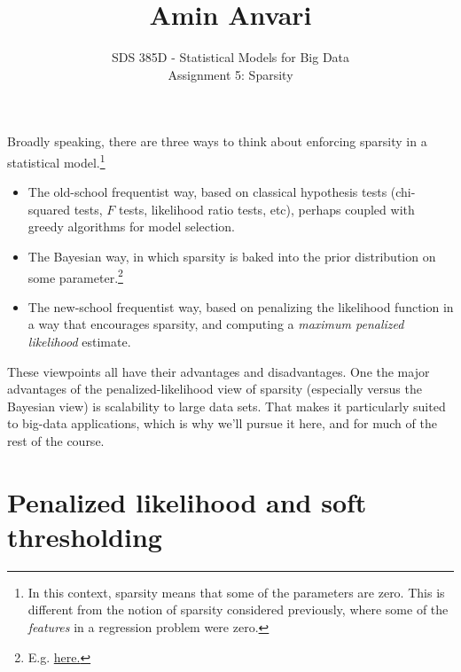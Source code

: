 \documentclass{article}
\title{Amin Anvari}
\date{}
\author{SDS 385D - Statistical Models for Big Data\\ Assignment 5: Sparsity}
\date{}  %
\begin{document}
\maketitle%

\bigskip


Broadly speaking, there are three ways to think about enforcing sparsity in a statistical model.\footnote{In this context, sparsity means that some of the parameters are zero.  This is different from the notion of sparsity considered previously, where some of the \textit{features} in a regression problem were zero.}
\begin{itemize}
\item The old-school frequentist way, based on classical hypothesis tests (chi-squared tests, $F$ tests, likelihood ratio tests, etc), perhaps coupled with greedy algorithms for model selection.
\item The Bayesian way, in which sparsity is baked into the prior distribution on some parameter.\footnote{E.g. \href{http://www-stat.wharton.upenn.edu/~edgeorge/Research_papers/fastN96.pdf}{here.}}
\item The new-school frequentist way, based on penalizing the likelihood function in a way that encourages sparsity, and computing a \textit{maximum penalized likelihood} estimate.
\end{itemize}

These viewpoints all have their advantages and disadvantages.  One the major advantages of the penalized-likelihood view of sparsity (especially versus the Bayesian view) is scalability to large data sets.  That makes it particularly suited to big-data applications, which is why we'll pursue it here, and for much of the rest of the course.

\section{Penalized likelihood and soft thresholding}
\end{document}
